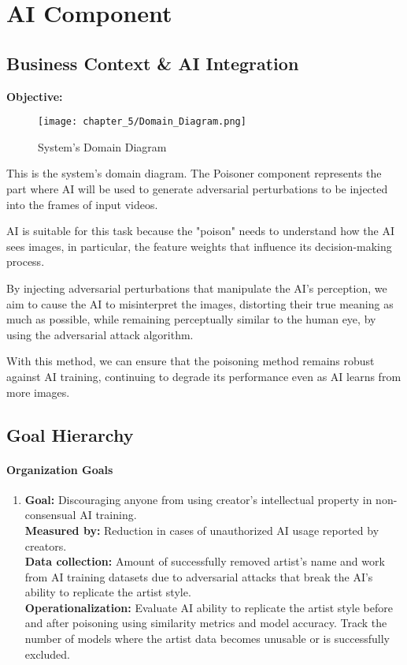 \chapter{AI Component}
\label{chap:ai-component}

\section{Business Context & AI Integration}
\label{section:business-context-and-AI-integration}
\textbf{Objective:}

\begin{figure}[h]
    \centering
    \texttt{[image: chapter\_5/Domain\_Diagram.png]}
    \caption{System's Domain Diagram}
\end{figure}

This is the system's domain diagram. The Poisoner component represents the part where AI will be used to generate adversarial perturbations to be injected into the frames of input videos.

AI is suitable for this task because the "poison" needs to understand how the AI sees images, in particular, the feature weights that influence its decision-making process. 

By injecting adversarial perturbations that manipulate the AI’s perception, we aim to cause the AI to misinterpret the images, distorting their true meaning as much as possible, while remaining perceptually similar to the human eye, by using the adversarial attack algorithm.

With this method, we can ensure that the poisoning method remains robust against AI training, continuing to degrade its performance even as AI learns from more images.

\section{Goal Hierarchy}
\label{section:goal-hierarchy}

\subsubsection{Organization Goals}
\begin{enumerate}
    \item 
    \textbf{Goal:}
    Discouraging anyone from using creator's intellectual property in non-consensual AI training. \\
    \textbf{Measured by:} 
    Reduction in cases of unauthorized AI usage reported by creators. \\
    \textbf{Data collection:}
    Amount of successfully removed artist's name and work from AI training datasets due to adversarial attacks that break the AI's ability to replicate the artist style. \\
    \textbf{Operationalization:} 
    Evaluate AI ability to replicate the artist style before and after poisoning using similarity metrics and model accuracy. Track the number of models where the artist data becomes unusable or is successfully excluded.
\end{enumerate}

